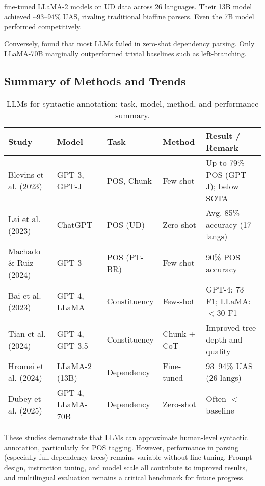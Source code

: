 \citet{hromei2024udllama} fine-tuned LLaMA-2 models on UD data across 26 languages. Their 13B model achieved \textasciitilde93--94\% UAS, rivaling traditional biaffine parsers. Even the 7B model performed competitively.

Conversely, \citet{dubey2025zeroshotdep} found that most LLMs failed in zero-shot dependency parsing. Only LLaMA-70B marginally outperformed trivial baselines such as left-branching.

\subsection{Summary of Methods and Trends}

\begin{table}[ht]
\centering
\begin{tabular}{p{3.3cm} p{2cm} p{2cm} p{2.5cm} p{3.5cm}}
\toprule
\textbf{Study} & \textbf{Model} & \textbf{Task} & \textbf{Method} & \textbf{Result / Remark} \\
\midrule
Blevins et al. (2023) & GPT-3, GPT-J & POS, Chunk & Few-shot & Up to 79\% POS (GPT-J); below SOTA \\
Lai et al. (2023) & ChatGPT & POS (UD) & Zero-shot & Avg. 85\% accuracy (17 langs) \\
Machado \& Ruiz (2024) & GPT-3 & POS (PT-BR) & Few-shot & 90\% POS accuracy \\
Bai et al. (2023) & GPT-4, LLaMA & Constituency & Few-shot & GPT-4: 73 F1; LLaMA: $<$30 F1 \\
Tian et al. (2024) & GPT-4, GPT-3.5 & Constituency & Chunk + CoT & Improved tree depth and quality \\
Hromei et al. (2024) & LLaMA-2 (13B) & Dependency & Fine-tuned & 93--94\% UAS (26 langs) \\
Dubey et al. (2025) & GPT-4, LLaMA-70B & Dependency & Zero-shot & Often $<$ baseline \\
\bottomrule
\end{tabular}
\caption{LLMs for syntactic annotation: task, model, method, and performance summary.}
\label{tab:llm_syntax}
\end{table}

These studies demonstrate that LLMs can approximate human-level syntactic annotation, particularly for POS tagging. However, performance in parsing (especially full dependency trees) remains variable without fine-tuning. Prompt design, instruction tuning, and model scale all contribute to improved results, and multilingual evaluation remains a critical benchmark for future progress.


